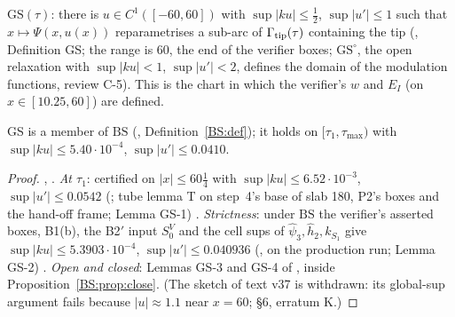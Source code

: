 \documentclass[11pt]{article}
\begin{document}
\begin{definition}\label{C:def:GS}
$\mathrm{GS}(\tau)$: there is $u\in C^1([-60,60])$ with $\sup|ku|\le\frac12$, $\sup|u'|\le1$ such that $x\mapsto\Psi(x,u(x))$ reparametrises a sub-arc of $\Gamma_{\rm tip}(\tau)$ containing the tip (, Definition GS; the range is $60$, the end of the verifier boxes; $\mathrm{GS}^\circ$, the open relaxation with $\sup|ku|<1$, $\sup|u'|<2$, defines the domain of the modulation functions, review C-5). This is the chart in which the verifier's $w$ and $E_I$ (on $x\in[10.25,60]$) are defined.
\end{definition}
\begin{lemma}\label{C:lem:GS}
GS is a member of $\mathrm{BS}$ (, Definition~\ref{BS:def}); it holds on $[\tau_1,\tau_{\max})$ with $\sup|ku|\le5.40\cdot10^{-4}$, $\sup|u'|\le0.0410$.
\end{lemma}
\begin{proof}\tHd, \tC. \emph{At $\tau_1$}: certified on $|x|\le60\frac14$ with $\sup|ku|\le6.52\cdot10^{-3}$, $\sup|u'|\le0.0542$ (; tube lemma T on step~4's base of slab 180, P2's boxes and the hand-off frame;  Lemma GS-1) \tC. \emph{Strictness}: under $\mathrm{BS}$ the verifier's asserted boxes, B1(b), the B2$'$ input $S^V_0$ and the cell sups of $\hat\psi_3,\hat h_2,k_{S_1}$ give $\sup|ku|\le5.3903\cdot10^{-4}$, $\sup|u'|\le0.040936$ (, on the  production run; Lemma GS-2) \tC. \emph{Open and closed}: Lemmas GS-3 and GS-4 of  \tHd, inside Proposition~\ref{BS:prop:close}. (The sketch of text v37 is withdrawn: its global-sup argument fails because $|u|\approx1.1$ near $x=60$;  \S6, erratum K.)
\end{proof}
\end{document}
